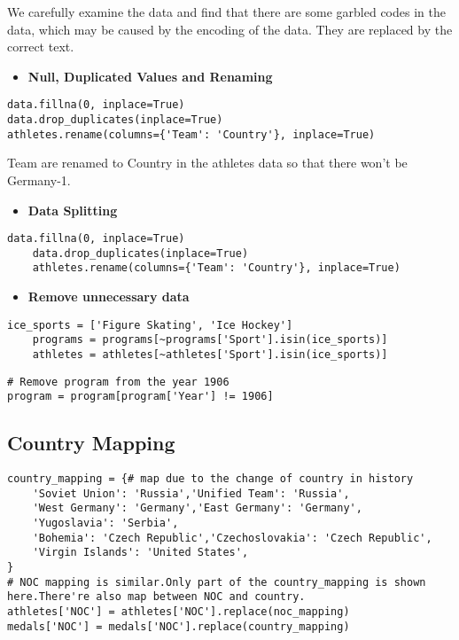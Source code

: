 We carefully examine the data and find that there are some garbled codes in the data, which may be caused by the encoding of the data. They are replaced by the correct text.

\begin{itemize}
    \item \textbf{Null, Duplicated Values and Renaming}
\end{itemize}

\begin{lstlisting}[caption=Data Cleaning]
data.fillna(0, inplace=True)
data.drop_duplicates(inplace=True)
athletes.rename(columns={'Team': 'Country'}, inplace=True)
\end{lstlisting}

Team are renamed to Country in the athletes data so that there won't be Germany-1.

\begin{itemize}
    \item \textbf{Data Splitting}
\end{itemize}

\begin{lstlisting}[caption=Data Splitting]
    data.fillna(0, inplace=True)
    data.drop_duplicates(inplace=True)
    athletes.rename(columns={'Team': 'Country'}, inplace=True)
    \end{lstlisting}

    \begin{itemize}
        \item \textbf{Remove unnecessary data}
    \end{itemize}
\begin{lstlisting}[caption=Remove Ice Sports]
    ice_sports = ['Figure Skating', 'Ice Hockey']
    programs = programs[~programs['Sport'].isin(ice_sports)]
    athletes = athletes[~athletes['Sport'].isin(ice_sports)]
\end{lstlisting}

\begin{lstlisting}[caption=Remove Program from 1906]
# Remove program from the year 1906
program = program[program['Year'] != 1906]    
\end{lstlisting}

\subsection{Country Mapping}

\begin{lstlisting}[caption=Country Mapping]
country_mapping = {# map due to the change of country in history
    'Soviet Union': 'Russia','Unified Team': 'Russia',
    'West Germany': 'Germany','East Germany': 'Germany',
    'Yugoslavia': 'Serbia',
    'Bohemia': 'Czech Republic','Czechoslovakia': 'Czech Republic',
    'Virgin Islands': 'United States',
}
# NOC mapping is similar.Only part of the country_mapping is shown here.There're also map between NOC and country.
athletes['NOC'] = athletes['NOC'].replace(noc_mapping)
medals['NOC'] = medals['NOC'].replace(country_mapping)
\end{lstlisting}

